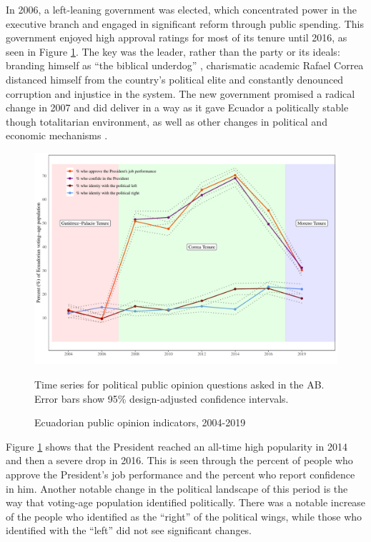 \documentclass[12pt,a4]{article}\usepackage[]{graphicx}\usepackage[]{xcolor}
\makeatletter
\def\maxwidth{ %
  \ifdim\Gin@nat@width>\linewidth
    \linewidth
  \else
    \Gin@nat@width
  \fi
}
\newenvironment{knitrout}{}{} %
\makeatother
\begin{document}
In 2006, a left-leaning government was elected, which concentrated power in the executive branch and engaged in significant reform through public spending. This government enjoyed high approval ratings for most of its tenure until 2016, as seen in Figure \ref{fig:ecua_pol}. The key was the leader, rather than the party or its ideals:  branding himself as \enquote{the biblical underdog} \parencite[para. 4]{Hedgecoe.2009}, charismatic academic Rafael Correa distanced himself from the country's political elite and constantly denounced corruption and injustice in the system. The new government promised a radical change in 2007 and did deliver in a way as it gave Ecuador a politically stable though totalitarian environment, as well as other changes in political and economic mechanisms \parencite{Weisbrot.2017}. 


\begin{figure}[htbp!]
\begin{knitrout}
\color{fgcolor}

{\centering \includegraphics[width=\maxwidth]{figure/political_graph-1} 

}


\end{knitrout}
\caption{Ecuadorian public opinion indicators, 2004-2019}
\label{fig:ecua_pol}
Time series for political public opinion questions asked in the AB. Error bars show 95\% design-adjusted confidence intervals.
\end{figure}

Figure \ref{fig:ecua_pol} shows that the President reached an all-time high popularity in 2014 and then a severe drop in 2016. This is seen through the percent of people who approve the President's job performance and the percent who report confidence in him. Another notable change in the political landscape of this period is the way that voting-age population identified politically. There was a notable increase of the people who identified as the \enquote{right} of the political wings, while those who identified with the \enquote{left} did not see significant changes. 
\end{document}

